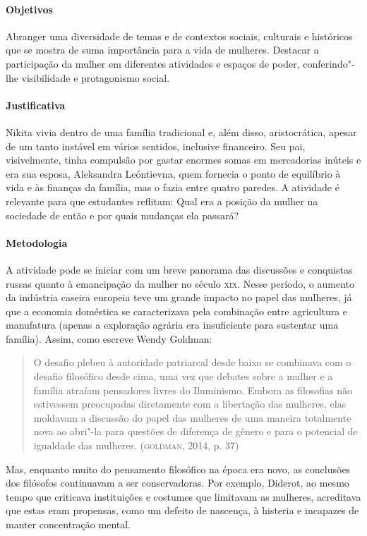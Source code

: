 \documentclass{article}
\begin{document}
\paragraph{Objetivos}
Abranger uma diversidade de temas e de contextos sociais, culturais e
históricos que se mostra de suma importância para a vida de mulheres.
Destacar a participação da mulher em diferentes atividades e espaços de
poder, conferindo"-lhe visibilidade e protagonismo social.

\paragraph{Justificativa}
Nikita vivia dentro de uma família tradicional e, além disso,
aristocrática, apesar de um tanto instável em vários sentidos, inclusive
financeiro. Seu pai, visivelmente, tinha compulsão por gastar enormes
somas em mercadorias inúteis e era sua esposa, Aleksandra Leóntievna,
quem fornecia o ponto de equilíbrio à vida e às finanças da família, mas
o fazia entre quatro paredes. A atividade é relevante para que
estudantes reflitam: Qual era a posição da mulher na sociedade de então
e por quais mudanças ela passará?

\paragraph{Metodologia}
A atividade pode se iniciar com um breve panorama das discussões e
conquistas russas quanto à emancipação da mulher no século \textsc{xix}. Nesse
período, o aumento da indústria caseira europeia teve um grande impacto
no papel das mulheres, já que a economia doméstica se caracterizava pela
combinação entre agricultura e manufatura (apenas a exploração agrária
era insuficiente para sustentar uma família). Assim, como escreve Wendy
Goldman:

\begin{quote}
O desafio plebeu à autoridade patriarcal desde baixo se combinava com o
desafio filosófico desde cima, uma vez que debates sobre a mulher e a
família atraíam pensadores livres do Iluminismo. Embora as filosofias
não estivessem preocupadas diretamente com a libertação das mulheres,
elas moldavam a discussão do papel das mulheres de uma maneira
totalmente nova ao abri"-la para questões de diferença de gênero e para o
potencial de igualdade das mulheres. (\textsc{goldman}, 2014, p. 37)
\end{quote}

Mas, enquanto muito do pensamento filosófico na época era novo, as
conclusões dos filósofos continuavam a ser conservadoras. Por exemplo,
Diderot, ao mesmo tempo que criticava instituições e costumes que
limitavam as mulheres, acreditava que estas eram propensas, como um
defeito de nascença, à histeria e incapazes de manter concentração
mental.
\end{document}
